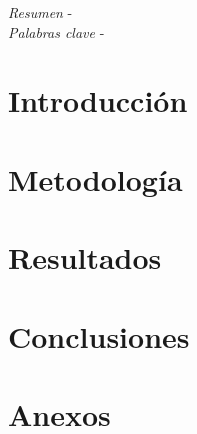 \documentclass{article}
\title{\tituloTrabajo} %
\author{
\autores \\
\normalsize \instituto \\ 
\normalsize \telefonos \correos 
}
\date{}
\begin{document}

\maketitle

\begin{multicols}{2}[]
\textit{Resumen} - \textbf{\resumen}
\\

\textit{Palabras clave} - \textbf{\palabrasClave}
\\

\section{Introducción}


\section{Metodología}


\section{Resultados}


\section{Conclusiones}



\end{multicols}

\pagebreak
\section*{Anexos}

\end{document}
